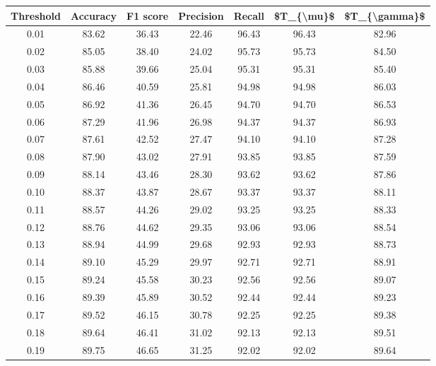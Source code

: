 \begin{tabular}{|c|c|c|c|c|c|c|}
\hline
 Threshold &  Accuracy &  F1 score &  Precision &  Recall &  \$T\_\{\textbackslash mu\}\$ &  \$T\_\{\textbackslash gamma\}\$ \\
\hline
      0.01 &     83.62 &     36.43 &      22.46 &   96.43 &      96.43 &         82.96 \\
      0.02 &     85.05 &     38.40 &      24.02 &   95.73 &      95.73 &         84.50 \\
      0.03 &     85.88 &     39.66 &      25.04 &   95.31 &      95.31 &         85.40 \\
      0.04 &     86.46 &     40.59 &      25.81 &   94.98 &      94.98 &         86.03 \\
      0.05 &     86.92 &     41.36 &      26.45 &   94.70 &      94.70 &         86.53 \\
      0.06 &     87.29 &     41.96 &      26.98 &   94.37 &      94.37 &         86.93 \\
      0.07 &     87.61 &     42.52 &      27.47 &   94.10 &      94.10 &         87.28 \\
      0.08 &     87.90 &     43.02 &      27.91 &   93.85 &      93.85 &         87.59 \\
      0.09 &     88.14 &     43.46 &      28.30 &   93.62 &      93.62 &         87.86 \\
      0.10 &     88.37 &     43.87 &      28.67 &   93.37 &      93.37 &         88.11 \\
      0.11 &     88.57 &     44.26 &      29.02 &   93.25 &      93.25 &         88.33 \\
      0.12 &     88.76 &     44.62 &      29.35 &   93.06 &      93.06 &         88.54 \\
      0.13 &     88.94 &     44.99 &      29.68 &   92.93 &      92.93 &         88.73 \\
      0.14 &     89.10 &     45.29 &      29.97 &   92.71 &      92.71 &         88.91 \\
      0.15 &     89.24 &     45.58 &      30.23 &   92.56 &      92.56 &         89.07 \\
      0.16 &     89.39 &     45.89 &      30.52 &   92.44 &      92.44 &         89.23 \\
      0.17 &     89.52 &     46.15 &      30.78 &   92.25 &      92.25 &         89.38 \\
      0.18 &     89.64 &     46.41 &      31.02 &   92.13 &      92.13 &         89.51 \\
      0.19 &     89.75 &     46.65 &      31.25 &   92.02 &      92.02 &         89.64 \\

\end{tabular}

